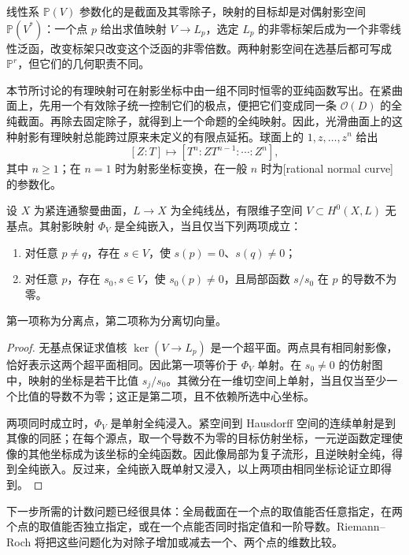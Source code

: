 线性系 \(\mathbb P(V)\) 参数化的是截面及其零除子，映射的目标却是对偶射影空间 \(\mathbb P(V^*)\)：一个点 \(p\) 给出求值映射 \(V\to L_p\)，选定 \(L_p\) 的非零标架后成为一个非零线性泛函，改变标架只改变这个泛函的非零倍数。两种射影空间在选基后都可写成 \(\mathbb P^r\)，但它们的几何职责不同。

\ProseParagraphBreak

本节所讨论的有理映射可在射影坐标中由一组不同时恒零的亚纯函数写出。在紧曲面上，先用一个有效除子统一控制它们的极点，便把它们变成同一条 \(\mathcal O(D)\) 的全纯截面。再除去固定除子，就得到上一个命题的全纯映射。因此，光滑曲面上的这种射影有理映射总能跨过原来未定义的有限点延拓。球面上的 \(1,z,\ldots,z^n\) 给出
\[
	[Z:T]\longmapsto[T^n:ZT^{n-1}:\cdots:Z^n],
\]
其中 \(n\ge1\)；在 \(n=1\) 时为射影坐标变换，在一般 \(n\) 时为[rational normal curve]的参数化。

\begin{proposition}\label{g4:prop:0301:embedding-criterion}
	设 \(X\) 为紧连通黎曼曲面，\(L\to X\) 为全纯线丛，有限维子空间 \(V\subset H^0(X,L)\) 无基点。其射影映射 \(\Phi_V\) 是全纯嵌入，当且仅当下列两项成立：
	\begin{enumerate}
		\item 对任意 \(p\ne q\)，存在 \(s\in V\)，使 \(s(p)=0\)、\(s(q)\ne0\)；
		\item 对任意 \(p\)，存在 \(s_0,s\in V\)，使 \(s_0(p)\ne0\)，且局部函数 \(s/s_0\) 在 \(p\) 的导数不为零。
	\end{enumerate}
	第一项称为分离点，第二项称为分离切向量。
\end{proposition}
\begin{proof}
	无基点保证求值核 \(\ker(V\to L_p)\) 是一个超平面。两点具有相同射影像，恰好表示这两个超平面相同。因此第一项等价于 \(\Phi_V\) 单射。在 \(s_0\ne0\) 的仿射图中，映射的坐标是若干比值 \(s_j/s_0\)。其微分在一维切空间上单射，当且仅当至少一个比值的导数不为零；这正是第二项，且不依赖所选中心坐标。

	两项同时成立时，\(\Phi_V\) 是单射全纯浸入。紧空间到 Hausdorff 空间的连续单射是到其像的同胚；在每个源点，取一个导数不为零的目标仿射坐标，一元逆函数定理使像的其他坐标成为该坐标的全纯函数。因此像局部为复子流形，且逆映射全纯，得到全纯嵌入。反过来，全纯嵌入既单射又浸入，以上两项由相同坐标论证立即得到。
\end{proof}

下一步所需的计数问题已经很具体：全局截面在一个点的取值能否任意指定，在两个点的取值能否独立指定，或在一个点能否同时指定值和一阶导数。Riemann--Roch 将把这些问题化为对除子增加或减去一个、两个点的维数比较。
